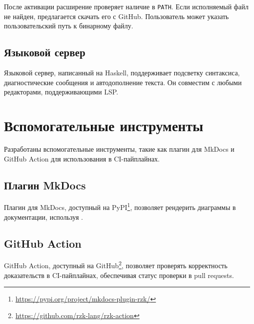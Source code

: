 После активации расширение проверяет наличие \Rzk{} в \texttt{PATH}. Если исполняемый файл не найден, предлагается скачать его с GitHub. Пользователь может указать пользовательский путь к бинарному файлу.

\subsection{Языковой сервер \Rzk{}}

Языковой сервер, написанный на Haskell, поддерживает подсветку синтаксиса, диагностические сообщения и автодополнение текста. Он совместим с любыми редакторами, поддерживающими LSP.

\section{Вспомогательные инструменты}

Разработаны вспомогательные инструменты, такие как плагин для MkDocs и GitHub Action для использования \Rzk{} в CI-пайплайнах.

\subsection{Плагин MkDocs}

Плагин для MkDocs, доступный на PyPI\footnote{\url{https://pypi.org/project/mkdocs-plugin-rzk/}}, позволяет рендерить диаграммы в документации, используя \Rzk{}.

\subsection{GitHub Action}

GitHub Action, доступный на GitHub\footnote{\url{https://github.com/rzk-lang/rzk-action}}, позволяет проверять корректность доказательств в CI-пайплайнах, обеспечивая статус проверки в pull requests.
